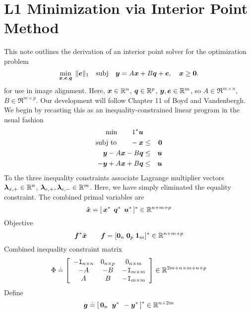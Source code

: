 
\section{L1 Minimization via Interior Point Method}

This note outlines the derivation of an interior point solver for the optimization problem
\begin{equation}
\min_{{\boldsymbol{x}},\boldsymbol{e},{\boldsymbol q}}\;  \| \boldsymbol{e} \|_1 \quad \mathrm{subj} \quad {\boldsymbol{y}} = A {\boldsymbol{x}} + B {\boldsymbol q} + \boldsymbol{e}, \quad {\boldsymbol{x}} \ge \boldsymbol{0}.
\end{equation}
for use in image alignment. Here, ${\boldsymbol{x}} \in \mathbb R^n$, ${\boldsymbol q} \in \mathbb R^p$, ${\boldsymbol{y}}, \boldsymbol{e} \in \mathbb R^m$, so $A \in \Re^{m \times n}$, $B \in \Re^{m\times p}$. Our development will follow Chapter 11 of Boyd and Vandenbergh. We begin by recasting this as an inequality-constrained linear program in the usual fashion
\begin{eqnarray*}
\min \qquad 1^* \boldsymbol{u} \\
\textup{subj to} \qquad -{\boldsymbol{x}} &\le& \boldsymbol{0} \\
{\boldsymbol{y}} - A{\boldsymbol{x}} - B{\boldsymbol q} &\le& \boldsymbol{u} \\
-{\boldsymbol{y}} + A {\boldsymbol{x}} + B{\boldsymbol q} &\le& \boldsymbol{u}
\end{eqnarray*}
To the three inequality constraints associate Lagrange multiplier vectors $\boldsymbol{\lambda}_{x,+} \in \mathbb R^n$, $\boldsymbol{\lambda}_{e,+}, \boldsymbol{\lambda}_{e,-} \in \mathbb R^m$. Here, we have simply eliminated the equality constraint. The combined primal variables are 
\begin{equation}
\tilde {{\boldsymbol{x}}} = [ \, {\boldsymbol{x}}^* \;\, {\boldsymbol q}^* \;\, \boldsymbol{u}^* \, ]^* \in \mathbb R^{n+m+p}
\end{equation}
Objective
\begin{equation}
\boldsymbol{f}^* \tilde {{\boldsymbol{x}}} \qquad   \boldsymbol{f} = [ \boldsymbol{0}_n \; \boldsymbol{0}_p \; {\boldsymbol{1}}_m ]^* \in \mathbb R^{n+m+p}
\end{equation}
Combined inequality constraint matrix 
\begin{equation}
\Phi \doteq \left[ \begin{array}{ccc} 
-\mathtt{I}_{n \times n} & 0_{n \times p} & 0_{n \times m} \\
-A &  -B & - \mathtt{I}_{m \times m} \\
A  &   B  &  - \mathtt{I}_{m \times m} \\
\end{array} \right] \in \mathbb R^{2m + n \times m + n + p}
\end{equation}
Define 
\begin{equation}
\boldsymbol{g} \doteq \left[ \, \boldsymbol{0}_n \;\; {\boldsymbol{y}}^* \;\, -{\boldsymbol{y}}^* \, \right]^* \in \mathbb R^{n + 2m}
\end{equation}
